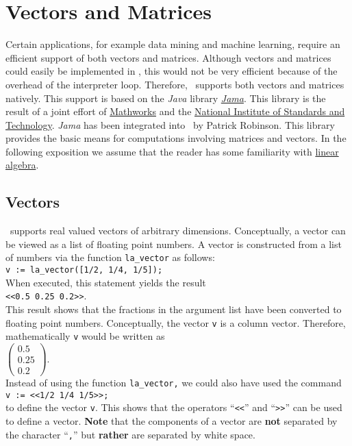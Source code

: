 \chapter{Vectors and Matrices \label{chapter:linear-algebra.tex}}
Certain applications, for example data mining and machine learning, require an efficient support of both
vectors and matrices. 
Although vectors and matrices could easily be implemented in \setlx, this would not be very
efficient because of the overhead of the interpreter loop.  Therefore, \setlx\ supports both vectors and
matrices natively.  This support is based on the \textsl{Java} library 
\href{http://math.nist.gov/javanumerics/jama/}{\textsl{Jama}}.  This library is the result of a joint effort of
\href{http://www.mathworks.com/}{Mathworks} and the \href{https://www.nist.gov}{National Institute
  of Standards and Technology}.  \textsl{Jama} has been integrated into  
\setlx\ by Patrick Robinson.  This library provides the basic means for computations involving
matrices and vectors.  In the following exposition we assume that the reader has some familiarity with  
\href{http://en.wikipedia.org/wiki/Linear_algebra}{linear algebra}.

\section{Vectors}
\setlx\ supports real valued vectors of arbitrary dimensions.  Conceptually, a vector can be viewed as
a list of floating point numbers.  A vector is constructed from a list of numbers via the
function \texttt{la\_vector} as follows:
\\[0.2cm]
\hspace*{1.3cm}
\texttt{v := la\_vector([1/2, 1/4, 1/5]);}
\\[0.2cm]
When executed, this statement yields the result
\\[0.2cm]
\hspace*{1.3cm}
\texttt{<<0.5 0.25 0.2>>}.
\\[0.2cm]
This result shows that the fractions in the argument list have been converted to floating point
numbers.  Conceptually, the vector \texttt{v} is a column vector.  Therefore, mathematically
\texttt{v} would be written as
\\[0.2cm]
\hspace*{1.3cm}
$
\left(\begin{array}{l}
  0.5  \\
  0.25 \\
  0.2
\end{array}\right)
$.
\\[0.2cm]
Instead of using the function \texttt{la\_vector,} we could also have used the command
\\[0.2cm]
\hspace*{1.3cm}
\texttt{v := <<1/2 1/4 1/5>>;}
\\[0.2cm]
to define the vector \texttt{v}.  This shows that the operators ``\texttt{<<}'' and ``\texttt{>>}''
can be used to define a vector.  \textbf{Note} that the components of a vector are \textbf{not} separated by the
character ``\texttt{,}'' but \textbf{rather} are separated by white space.

